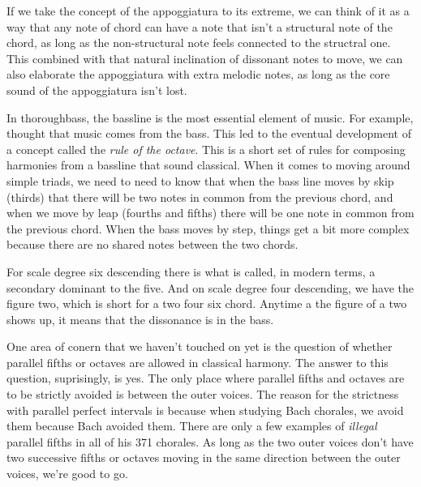 
If we take the concept of the appoggiatura to its extreme, we can think of it as a way that any note of chord can have a note that isn't a structural note of the chord, as long as the non-structural note feels connected to the structral one. This combined with that natural inclination of dissonant notes to move, we can also elaborate the appoggiatura with extra melodic notes, as long as the core sound of the appoggiatura isn't lost.

In thoroughbass, the bassline is the most essential element of music. For example, \JSBach thought that music comes from the bass. This led to the eventual development of a concept called the \emph{rule of the octave}. This is a short set of rules for composing harmonies from a bassline that sound classical. When it comes to moving around simple triads, we need to need to know that when the bass line moves by skip (thirds) that there will be two notes in common from the previous chord, and when we move by leap (fourths and fifths) there will be one note in common from the previous chord. When the bass moves by step, things get a bit more complex because there are no shared notes between the two chords.


For scale degree six descending there is what is called, in modern terms, a secondary dominant to the five. And on scale degree four descending, we have the figure two, which is short for a two four six chord. Anytime a the figure of a two shows up, it means that the dissonance is in the bass.


One area of conern that we haven't touched on yet is the question of whether parallel fifths or octaves are allowed in classical harmony. The answer to this question, suprisingly, is yes. The only place where parallel fifths and octaves are to be strictly avoided is between the outer voices. The reason for the strictness with parallel perfect intervals is because when studying Bach chorales, we avoid them because Bach avoided them. There are only a few examples of \emph{illegal} parallel fifths in all of his 371 chorales. As long as the two outer voices don't have two successive fifths or octaves moving in the same direction between the outer voices, we're good to go.

